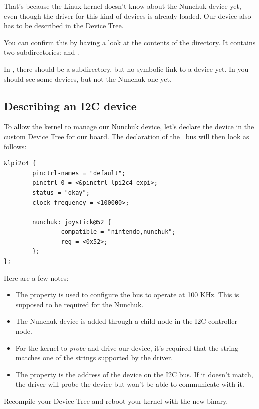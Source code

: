 That's because the Linux kernel doesn't know about the Nunchuk
device yet, even though the driver for this kind of devices is
already loaded. Our device also has to be described in the Device Tree.

You can confirm this by having a look at the contents of the
 directory.  It contains two subdirectories:
 and .

In , there should be a  subdirectory,
but no symbolic link to a device yet. In  you should
see some devices, but not the Nunchuk one yet.

\subsection{Describing an I2C device}

To allow the kernel to manage our Nunchuk device, let's declare the
device in the custom Device Tree for our board. The declaration of the \busname\
bus will then look as follows:

\begin{verbatim}
&lpi2c4 {
        pinctrl-names = "default";
        pinctrl-0 = <&pinctrl_lpi2c4_expi>;
        status = "okay";
        clock-frequency = <100000>;

        nunchuk: joystick@52 {
                compatible = "nintendo,nunchuk";
                reg = <0x52>;
        };
};
\end{verbatim}

Here are a few notes:
\begin{itemize}
\item The  property is used to configure the bus
      to operate at 100 KHz. This is supposed to be required for the
      Nunchuk.
\item The Nunchuk device is added through a child node in the I2C
      controller node.
\item For the kernel to {\em probe} and drive our device, it's required
      that the  string matches one of the
      \code{compatible} strings supported by the driver.
\item The  property is the address of the device on the
      I2C bus. If it doesn't match, the driver will probe the device
      but won't be able to communicate with it.
\end{itemize}

Recompile your Device Tree and reboot your kernel with the new binary.

